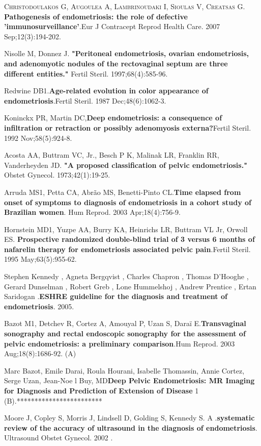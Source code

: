 \documentclass[12pt]{article} %
\begin{document}
\textsc{Christodoulakos G, Augoulea A, Lambrinoudaki I, Sioulas V, Creatsas G}. \textbf{Pathogenesis of endometriosis: the role of defective 'immunosurveillance'}.Eur J Contracept Reprod Health Care. 2007 Sep;12(3):194-202.

Nisolle M, Donnez J. \textbf{"Peritoneal endometriosis, ovarian endometriosis, and
adenomyotic nodules of the rectovaginal septum are three different entities."}
Fertil Steril. 1997;68(4):585-96.

Redwine DB1.\textbf{Age-related evolution in color appearance of endometriosis}.Fertil Steril. 1987 Dec;48(6):1062-3.

Koninckx PR, Martin DC,\textbf{Deep endometriosis: a consequence of infiltration or retraction or possibly adenomyosis externa?}Fertil Steril. 1992 Nov;58(5):924-8.

Acosta AA, Buttram VC, Jr., Besch P K, Malinak LR, Franklin RR,
Vanderheyden JD.\textbf{ "A proposed classification of pelvic endometriosis."}
Obstet Gynecol. 1973;42(1):19-25.


Arruda MS1, Petta CA, Abrão MS, Benetti-Pinto CL.\textbf{Time elapsed from onset of symptoms to diagnosis of endometriosis in a cohort study of Brazilian women}. Hum Reprod. 2003 Apr;18(4):756-9.

Hornstein MD1, Yuzpe AA, Burry KA, Heinrichs LR, Buttram VL Jr, Orwoll ES. \textbf{Prospective randomized double-blind trial of 3 versus 6 months of nafarelin therapy for endometriosis associated pelvic pain}.Fertil Steril. 1995 May;63(5):955-62.

Stephen Kennedy , Agneta Bergqvist  , Charles Chapron  , Thomas D’Hooghe  , Gerard Dunselman  , Robert Greb  , Lone Hummelshoj  , Andrew Prentice  , Ertan Saridogan .\textbf{ESHRE guideline for the diagnosis and treatment of endometriosis}. 2005.

Bazot M1, Detchev R, Cortez A, Amouyal P, Uzan S, Daraï E.\textbf{Transvaginal sonography and rectal endoscopic sonography for the assessment of pelvic endometriosis: a preliminary comparison}.Hum Reprod. 2003 Aug;18(8):1686-92. (A)

Marc Bazot, Emile Darai, Roula Hourani, Isabelle Thomassin, Annie Cortez, Serge Uzan, 
Jean-Noe l Buy, MD\textbf{Deep Pelvic Endometriosis: MR Imaging for Diagnosis and Prediction of Extension of Disease }1 (B).************************


Moore J, Copley S, Morris J, Lindsell D, Golding S, Kennedy S. A .\textbf{systematic review of the accuracy of ultrasound in the diagnosis of endometriosis}. Ultrasound Obstet Gynecol. 2002 .
\end{document}
